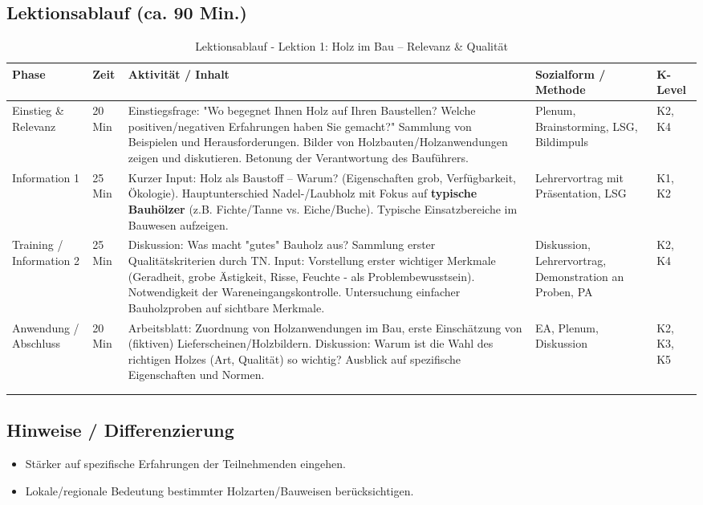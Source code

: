 \documentclass[12pt, a4paper]{article}
\begin{document}
\subsection{Lektionsablauf (ca. 90 Min.)}
\begin{longtable}{|p{}|p{}|>{\raggedright\arraybackslash}p{}|p{}|p{}|}
    \hline
    \textbf{Phase} & \textbf{Zeit} & \textbf{Aktivität / Inhalt} & \textbf{Sozialform / Methode} & \textbf{K-Level} \\
    \hline
    \endhead %

    Einstieg \& Relevanz & 20 Min & Einstiegsfrage: "Wo begegnet Ihnen Holz auf Ihren Baustellen? Welche positiven/negativen Erfahrungen haben Sie gemacht?" Sammlung von Beispielen und Herausforderungen. Bilder von Holzbauten/Holzanwendungen zeigen und diskutieren. Betonung der Verantwortung des Bauführers. & Plenum, Brainstorming, LSG, Bildimpuls & K2, K4 \\
    \hline
    Information 1 & 25 Min & Kurzer Input: Holz als Baustoff – Warum? (Eigenschaften grob, Verfügbarkeit, Ökologie). Hauptunterschied Nadel-/Laubholz mit Fokus auf \textbf{typische Bauhölzer} (z.B. Fichte/Tanne vs. Eiche/Buche). Typische Einsatzbereiche im Bauwesen aufzeigen. & Lehrervortrag mit Präsentation, LSG & K1, K2 \\
    \hline
    Training / Information 2 & 25 Min & Diskussion: Was macht "gutes" Bauholz aus? Sammlung erster Qualitätskriterien durch TN. Input: Vorstellung erster wichtiger Merkmale (Geradheit, grobe Ästigkeit, Risse, Feuchte - als Problembewusstsein). Notwendigkeit der Wareneingangskontrolle. Untersuchung einfacher Bauholzproben auf sichtbare Merkmale. & Diskussion, Lehrervortrag, Demonstration an Proben, PA & K2, K4 \\
    \hline
    Anwendung / Abschluss & 20 Min & Arbeitsblatt: Zuordnung von Holzanwendungen im Bau, erste Einschätzung von (fiktiven) Lieferscheinen/Holzbildern. Diskussion: Warum ist die Wahl des richtigen Holzes (Art, Qualität) so wichtig? Ausblick auf spezifische Eigenschaften und Normen. & EA, Plenum, Diskussion & K2, K3, K5 \\
    \hline
    \caption{Lektionsablauf - Lektion 1: Holz im Bau – Relevanz \& Qualität} \\
    \label{tab:lektion1-bf}
\end{longtable}

\subsection{Hinweise / Differenzierung}
\begin{itemize}
    \item Stärker auf spezifische Erfahrungen der Teilnehmenden eingehen.
    \item Lokale/regionale Bedeutung bestimmter Holzarten/Bauweisen berücksichtigen.
\end{itemize}
\end{document}

